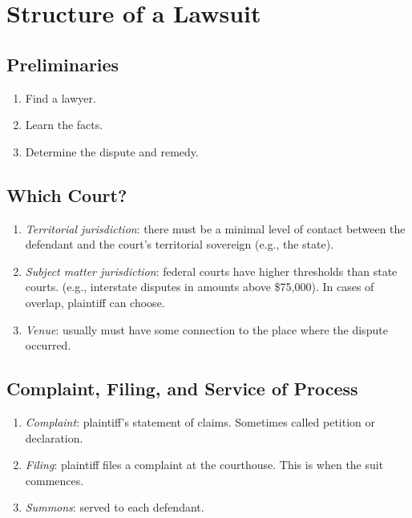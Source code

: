 \section{Structure of a Lawsuit}

\subsection{Preliminaries}

\begin{enumerate}
    \item Find a lawyer.
    \item Learn the facts.
    \item Determine the dispute and remedy.
\end{enumerate}

\subsection{Which Court?}

\begin{enumerate}
    \item \emph{Territorial jurisdiction}: there must be a minimal level of 
    contact between the defendant and the court's territorial sovereign (e.g., 
    the state).
    \item \emph{Subject matter jurisdiction}: federal courts have higher 
    thresholds than state courts. (e.g., interstate disputes in amounts above 
    \$75,000). In cases of overlap, plaintiff can choose.
    \item \emph{Venue}: usually must have some connection to the place where 
    the dispute occurred.
\end{enumerate}

\subsection{Complaint, Filing, and Service of Process}

\begin{enumerate}
    \item \emph{Complaint}: plaintiff's statement of claims. Sometimes called 
    petition or declaration.
    \item \emph{Filing}: plaintiff files a complaint at the courthouse. This 
    is when the suit commences.
    \item \emph{Summons}: served to each defendant.
\end{enumerate}

